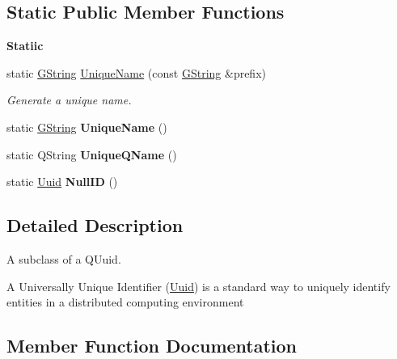 \subsection*{Static Public Member Functions}
\begin{Indent}\textbf{ Statiic}\par
\begin{DoxyCompactItemize}
\item 
\mbox{\label{classrev_1_1_uuid_a9dacdfb770ee32c78f96735f1e4fba48}} 
static \mbox{\hyperlink{classrev_1_1_g_string}{G\+String}} \mbox{\hyperlink{classrev_1_1_uuid_a9dacdfb770ee32c78f96735f1e4fba48}{Unique\+Name}} (const \mbox{\hyperlink{classrev_1_1_g_string}{G\+String}} \&prefix)
\begin{DoxyCompactList}\small\item\em Generate a unique name. \end{DoxyCompactList}\item 
\mbox{\label{classrev_1_1_uuid_afefb7dbb593974acb21434b601630e12}} 
static \mbox{\hyperlink{classrev_1_1_g_string}{G\+String}} {\bfseries Unique\+Name} ()
\item 
\mbox{\label{classrev_1_1_uuid_a29bef0d3bb2173aa824a20aed5ed5d6c}} 
static Q\+String {\bfseries Unique\+Q\+Name} ()
\item 
\mbox{\label{classrev_1_1_uuid_a59aefebe2ae6c76f33cb09a7afea05bb}} 
static \mbox{\hyperlink{classrev_1_1_uuid}{Uuid}} {\bfseries Null\+ID} ()
\end{DoxyCompactItemize}
\end{Indent}


\subsection{Detailed Description}
A subclass of a Q\+Uuid. 

A Universally Unique Identifier (\mbox{\hyperlink{classrev_1_1_uuid}{Uuid}}) is a standard way to uniquely identify entities in a distributed computing environment 

\subsection{Member Function Documentation}
\mbox{\label{classrev_1_1_uuid_ad6a1edca9a420a819804844104e51908}} 

